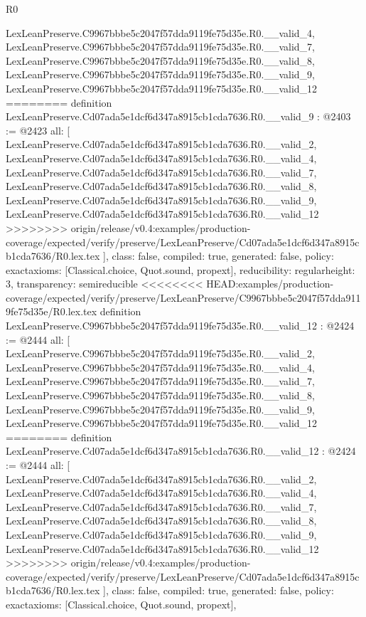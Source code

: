 \begin{lexlean}{R0}
\begin{coremodule}
{{{{{{{{{{{{{{{{{{{{{{{{{{{{{{{{{{{{{{{{{{{{{{{{    LexLeanPreserve.C9967bbbe5c2047f57dda9119fe75d35e.R0.__valid_4,
    LexLeanPreserve.C9967bbbe5c2047f57dda9119fe75d35e.R0.__valid_7,
    LexLeanPreserve.C9967bbbe5c2047f57dda9119fe75d35e.R0.__valid_8,
    LexLeanPreserve.C9967bbbe5c2047f57dda9119fe75d35e.R0.__valid_9,
    LexLeanPreserve.C9967bbbe5c2047f57dda9119fe75d35e.R0.__valid_12
========
definition LexLeanPreserve.Cd07ada5e1dcf6d347a8915cb1cda7636.R0.__valid_9 : @2403 := @2423 {
  all: [
    LexLeanPreserve.Cd07ada5e1dcf6d347a8915cb1cda7636.R0.__valid_2,
    LexLeanPreserve.Cd07ada5e1dcf6d347a8915cb1cda7636.R0.__valid_4,
    LexLeanPreserve.Cd07ada5e1dcf6d347a8915cb1cda7636.R0.__valid_7,
    LexLeanPreserve.Cd07ada5e1dcf6d347a8915cb1cda7636.R0.__valid_8,
    LexLeanPreserve.Cd07ada5e1dcf6d347a8915cb1cda7636.R0.__valid_9,
    LexLeanPreserve.Cd07ada5e1dcf6d347a8915cb1cda7636.R0.__valid_12
>>>>>>>> origin/release/v0.4:examples/production-coverage/expected/verify/preserve/LexLeanPreserve/Cd07ada5e1dcf6d347a8915cb1cda7636/R0.lex.tex
  ],
  class: false,
  compiled: true,
  generated: false,
  policy: exact{axioms: [Classical.choice, Quot.sound, propext]},
  reducibility: regular{height: 3},
  transparency: semireducible
}
<<<<<<<< HEAD:examples/production-coverage/expected/verify/preserve/LexLeanPreserve/C9967bbbe5c2047f57dda9119fe75d35e/R0.lex.tex
definition LexLeanPreserve.C9967bbbe5c2047f57dda9119fe75d35e.R0.__valid_12 : @2424 := @2444 {
  all: [
    LexLeanPreserve.C9967bbbe5c2047f57dda9119fe75d35e.R0.__valid_2,
    LexLeanPreserve.C9967bbbe5c2047f57dda9119fe75d35e.R0.__valid_4,
    LexLeanPreserve.C9967bbbe5c2047f57dda9119fe75d35e.R0.__valid_7,
    LexLeanPreserve.C9967bbbe5c2047f57dda9119fe75d35e.R0.__valid_8,
    LexLeanPreserve.C9967bbbe5c2047f57dda9119fe75d35e.R0.__valid_9,
    LexLeanPreserve.C9967bbbe5c2047f57dda9119fe75d35e.R0.__valid_12
========
definition LexLeanPreserve.Cd07ada5e1dcf6d347a8915cb1cda7636.R0.__valid_12 : @2424 := @2444 {
  all: [
    LexLeanPreserve.Cd07ada5e1dcf6d347a8915cb1cda7636.R0.__valid_2,
    LexLeanPreserve.Cd07ada5e1dcf6d347a8915cb1cda7636.R0.__valid_4,
    LexLeanPreserve.Cd07ada5e1dcf6d347a8915cb1cda7636.R0.__valid_7,
    LexLeanPreserve.Cd07ada5e1dcf6d347a8915cb1cda7636.R0.__valid_8,
    LexLeanPreserve.Cd07ada5e1dcf6d347a8915cb1cda7636.R0.__valid_9,
    LexLeanPreserve.Cd07ada5e1dcf6d347a8915cb1cda7636.R0.__valid_12
>>>>>>>> origin/release/v0.4:examples/production-coverage/expected/verify/preserve/LexLeanPreserve/Cd07ada5e1dcf6d347a8915cb1cda7636/R0.lex.tex
  ],
  class: false,
  compiled: true,
  generated: false,
  policy: exact{axioms: [Classical.choice, Quot.sound, propext]},
}}}}}}}}}}}}}}}}}}}}}}}}}}}}}}}}}}}}}}}}}}}}}}}}}}
\end{coremodule}
\end{lexlean}
